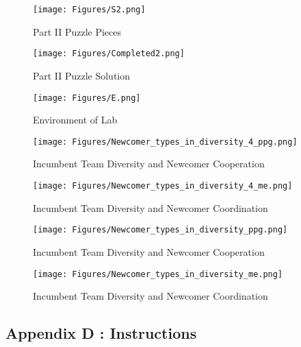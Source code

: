 \begin{figure}[H]
 \captionsetup{justification=raggedright,singlelinecheck=false}
\caption{Part II Puzzle Pieces}
\texttt{[image: Figures/S2.png]} 
\end{figure}


\begin{figure}[H]
 \captionsetup{justification=raggedright,singlelinecheck=false}
\caption{Part II Puzzle Solution}
\texttt{[image: Figures/Completed2.png]} 
\end{figure}

\begin{figure}[H]
 \captionsetup{justification=raggedright,singlelinecheck=false}
\caption{Environment of Lab}
\texttt{[image: Figures/E.png]} 
\end{figure}

\begin{figure}[H]
 \captionsetup{justification=raggedright,singlelinecheck=false}
\caption{Incumbent Team Diversity and Newcomer Cooperation }
\texttt{[image: Figures/Newcomer\_types\_in\_diversity\_4\_ppg.png]} 
\end{figure}



\begin{figure}[H]
 \captionsetup{justification=raggedright,singlelinecheck=false}
\caption{Incumbent Team Diversity and Newcomer Coordination }
\texttt{[image: Figures/Newcomer\_types\_in\_diversity\_4\_me.png]} 
\end{figure}

\begin{figure}[H]
 \captionsetup{justification=raggedright,singlelinecheck=false}
\caption{Incumbent Team Diversity and Newcomer Cooperation }
\texttt{[image: Figures/Newcomer\_types\_in\_diversity\_ppg.png]} 
\end{figure}


\begin{figure}[H]
 \captionsetup{justification=raggedright,singlelinecheck=false}
\caption{Incumbent Team Diversity and Newcomer Coordination }
\texttt{[image: Figures/Newcomer\_types\_in\_diversity\_me.png]} 
\end{figure}


\subsection{Appendix D : Instructions}
